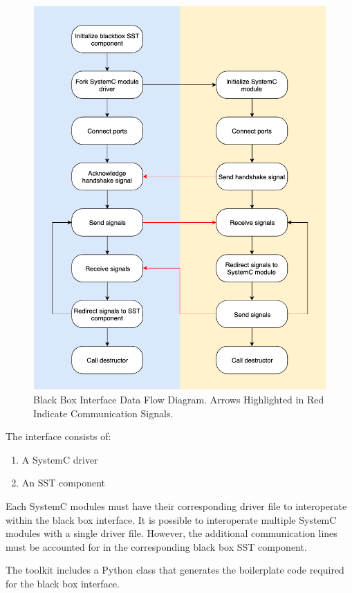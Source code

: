 \documentclass{article}
\begin{document}
  \begin{figure}[!h]
    \centering
    \includegraphics[width=5in]{diagrams/data_flow.png}
    \caption{Black Box Interface Data Flow Diagram. Arrows Highlighted in Red Indicate Communication Signals.}
    \label{fig:data_flow}
  \end{figure}

  The interface consists of:
  \begin{enumerate}
    \item A SystemC driver
    \item An SST component
  \end{enumerate}

  Each SystemC modules must have their corresponding driver file to interoperate within the black
  box interface. It is possible to interoperate multiple SystemC modules with a single driver
  file. However, the additional communication lines must be accounted for in the corresponding
  black box SST component.

  The toolkit includes a Python class that generates the boilerplate code required for the black
  box interface.
\end{document}
